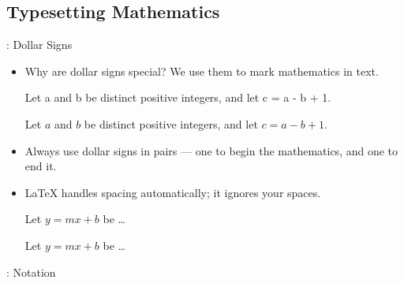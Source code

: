 \documentclass[aspectratio=169]{beamer}
\begin{document}
\subsection{Typesetting Mathematics}
\begin{frame}[fragile]{\insertsubsection{}: Dollar Signs}
\begin{itemize}
\item Why are dollar signs \keystrokebftt{\$} special? We use them to mark mathematics in text.\\[1ex]
\begin{exampletwouptiny}
Let a and b be distinct positive
integers, and let c = a - b + 1.

Let $a$ and $b$ be distinct positive
integers, and let $c = a - b + 1$.
\end{exampletwouptiny}
\item Always use dollar signs in pairs --- one to begin the mathematics, and one
to end it.
\item \LaTeX{} handles spacing automatically; it ignores your spaces.
\begin{exampletwouptiny}
Let $y=mx+b$ be \ldots

Let $y = m x + b$ be \ldots
\end{exampletwouptiny}
\end{itemize}
\end{frame}

\begin{frame}[fragile]{\insertsubsection{}: Notation}
\end{frame}
\end{document}
